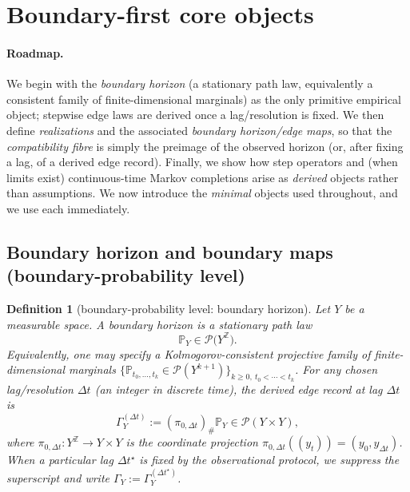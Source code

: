 \documentclass[11pt]{article}
\newtheorem{definition}{Definition}
\newcommand{\Pcal}{\mathcal{P}}
\begin{document}
\section{Boundary-first core objects}
\label{sec:boundary-core}


\paragraph{Roadmap.}
We begin with the \emph{boundary horizon} (a stationary path law, equivalently a consistent family of finite-dimensional marginals) as the only primitive empirical object; stepwise edge laws are derived once a lag/resolution is fixed.
We then define \emph{realizations} and the associated \emph{boundary horizon/edge maps}, so that the \emph{compatibility fibre} is simply the preimage of the observed horizon (or, after fixing a lag, of a derived edge record).
Finally, we show how step operators and (when limits exist) continuous-time Markov completions arise as \emph{derived} objects rather than assumptions.
\medskip
We now introduce the \emph{minimal} objects used throughout, and we use each immediately.

\subsection{Boundary horizon and boundary maps (boundary-probability level)}

\begin{definition}[boundary-probability level: boundary horizon]
\label{def:boundary-record}
Let $Y$ be a measurable space. A \emph{boundary horizon} is a stationary path law
\[
\mathbb P_Y \in \Pcal\bigl(Y^{\mathbb Z}\bigr).
\]
Equivalently, one may specify a Kolmogorov-consistent projective family of finite-dimensional marginals
$\{\mathbb P_{t_0,\dots,t_k}\in\Pcal(Y^{k+1})\}_{k\ge 0,\ t_0<\cdots<t_k}$.
For any chosen lag/resolution $\Delta t$ (an integer in discrete time), the \emph{derived edge record at lag $\Delta t$} is
\[
\Gamma_Y^{(\Delta t)} := (\pi_{0,\Delta t})_\# \mathbb P_Y \in \Pcal(Y\times Y),
\]
where $\pi_{0,\Delta t}:Y^{\mathbb Z}\to Y\times Y$ is the coordinate projection $\pi_{0,\Delta t}((y_t))=(y_0,y_{\Delta t})$.
When a particular lag $\Delta t^\star$ is fixed by the observational protocol, we suppress the superscript and write
$\Gamma_Y := \Gamma_Y^{(\Delta t^\star)}$.
\end{definition}
\end{document}
